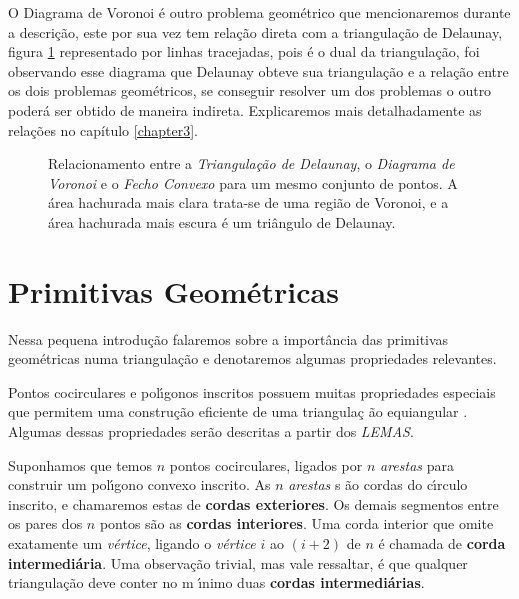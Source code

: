 \documentclass[12pt,a4paper]{book}
\begin{document}
O Diagrama de Voronoi \'e outro problema geom\'etrico que mencionaremos durante a descri\c{c}\~{a}o, este por sua vez tem rela\c{c}\~{a}o direta com a triangula\c{c}\~{a}o de Delaunay, figura \ref{relacionamento} representado por linhas tracejadas, pois \'e o dual da triangula\c{c}\~{a}o, foi observando esse diagrama que Delaunay obteve sua triangula\c{c}\~{a}o e a rela\c{c}\~{a}o entre os dois problemas geom\'etricos, se conseguir resolver um dos problemas o outro poder\'a ser obtido de maneira indireta. Explicaremos mais detalhadamente as rela\c{c}\~{o}es no cap\'itulo \ref{chapter3}.

\begin{figure}[htbp]
  \begin{center}
    \leavevmode
    
    \caption{Relacionamento entre a \textit{Triangula\c{c}\~{a}o de Delaunay}, o \textit{Diagrama de Voronoi} e o \textit{Fecho Convexo} para um mesmo conjunto de pontos. A \'area hachurada mais clara trata-se de uma regi\~ao de Voronoi, e a \'area hachurada mais escura \'e um tri\^angulo de Delaunay.}
    \label{relacionamento}
  \end{center}
\end{figure}

\section{Primitivas Geom\'{e}tricas}

Nessa pequena introdu\c{c}\~{a}o falaremos sobre a import\^{a}ncia das
primitivas geom\'{e}tricas numa triangula\c{c}\~{a}o e denotaremos algumas
propriedades relevantes.

Pontos cocirculares e pol\'{\i}gonos inscritos possuem muitas propriedades
especiais que permitem uma constru\c{c}\~{a}o eficiente de uma triangula\c{c}%
\~{a}o equiangular \cite{sibson}. Algumas dessas propriedades ser\~{a}o descritas a partir
dos \textit{LEMAS}.

Suponhamos que temos $n$ pontos cocirculares, ligados por $n$ \textit{arestas}
para construir um pol\'{\i}gono convexo inscrito. As $n$ \textit{arestas} s%
\~{a}o cordas do c\'{\i}rculo inscrito, e chamaremos estas de \textbf{cordas
exteriores}. Os demais segmentos entre os pares dos $n$ pontos s\~{a}o as 
\textbf{cordas interiores}. Uma corda interior que omite exatamente um \textit{%
v\'{e}rtice}, ligando o \textit{v\'{e}rtice} $i$ ao $(i+2)$ de $n$ \'{e}
chamada de \textbf{corda intermedi\'{a}ria}. Uma observa\c{c}\~{a}o trivial,
mas vale ressaltar, \'{e} que qualquer triangula\c{c}\~{a}o deve conter no m%
\'{\i}nimo duas \textbf{cordas intermedi\'{a}rias}.
\end{document}
